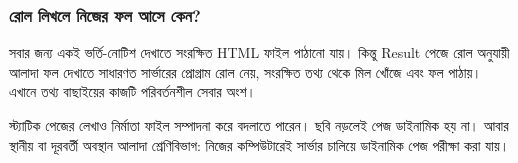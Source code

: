 \subsubsection{রোল লিখলে নিজের ফল আসে কেন?}
সবার জন্য একই ভর্তি-নোটিশ দেখাতে সংরক্ষিত HTML ফাইল পাঠানো যায়। কিন্তু Result পেজে রোল অনুযায়ী আলাদা ফল দেখাতে সাধারণত সার্ভারের প্রোগ্রাম রোল নেয়, সংরক্ষিত তথ্য থেকে মিল খোঁজে এবং ফল পাঠায়। এখানে তথ্য বাছাইয়ের কাজটি পরিবর্তনশীল সেবার অংশ।

স্ট্যাটিক পেজের লেখাও নির্মাতা ফাইল সম্পাদনা করে বদলাতে পারেন। ছবি নড়লেই পেজ ডাইনামিক হয় না। আবার স্থানীয় বা দূরবর্তী অবস্থান আলাদা শ্রেণিবিভাগ: নিজের কম্পিউটারেই সার্ভার চালিয়ে ডাইনামিক পেজ পরীক্ষা করা যায়।

